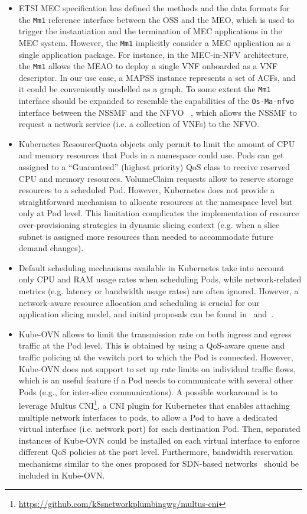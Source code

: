 \begin{itemize}[noitemsep,topsep=2pt]
    \item ETSI MEC specification has defined the methods and the data formats for the \texttt{Mm1} reference interface between the OSS and the MEO, which is used to trigger the instantiation and the termination of MEC applications in the MEC system. However, the \texttt{Mm1} implicitly consider a MEC application as a single application package. For instance, in the MEC-in-NFV architecture, the \texttt{Mm1} allows the MEAO to  deploy a single VNF onboarded as a VNF descriptor. In our use case, a MAPSS instance represents a set of ACFs, and it could be conveniently modelled as a graph. To some extent the \texttt{Mm1} interface should be expanded to resemble the capabilities of the \texttt{Os-Ma-nfvo} interface between the NSSMF and the NFVO~\cite{NFV-SOL005} , which allows the NSSMF to request a network service (i.e. a collection of VNFs) to the NFVO.
    \item Kubernetes ResourceQuota objects only permit to limit the amount of CPU and memory resources that Pods in a namespace could use. Pods can get assigned to a ``Guaranteed'' (highest priority) QoS class to receive reserved CPU and memory resources. VolumeClaim requests allow to reserve storage resources to a scheduled Pod. However, Kubernetes does not provide a straightforward mechanism to allocate resources at the namespace level but only at Pod level. This limitation complicates the implementation of resource over-provisioning strategies in dynamic slicing context (e.g. when a slice subnet is assigned more resources than needed to accommodate future demand changes).
    \item Default scheduling mechanisms available in Kubernetes take into account only CPU and RAM usage rates when scheduling Pods, while network-related metrics (e.g. latency or bandwidth usage rates) are often ignored. However, a network-aware resource allocation and scheduling is crucial for our application slicing model, and initial proposals can be found in~\cite{2019_netsoft_netaware_kube} and~\cite{2020_noms_delayaware_kube}.
    \item Kube-OVN allows to limit the transmission rate on both ingress and egress traffic at the Pod level. This is obtained by using a QoS-aware queue and traffic policing at the vswitch port to which the Pod is connected. However, Kube-OVN does not support to set up rate limits on individual traffic flows, which is an useful feature if a Pod needs to communicate with several other Pods (e.g., for inter-slice communications). A possible workaround is to leverage Multus CNI\footnote{\url{https://github.com/k8snetworkplumbingwg/multus-cni}}, a CNI plugin for Kubernetes that enables attaching multiple network interfaces to pods, to allow a Pod to have a dedicated virtual interface (i.e. network port) for each destination Pod. Then, separated instances of Kube-OVN could be installed on each virtual interface to enforce different QoS policies at the port level. Furthermore, bandwidth reservation mechanisms similar to the ones proposed for SDN-based networks~\cite{2016_bwguar_openflow} should be included in Kube-OVN. 

\end{itemize}
